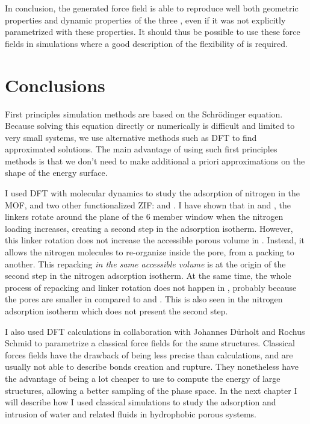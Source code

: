 \documentclass[thesis]{subfiles}
\begin{document}
In conclusion, the generated force field is able to reproduce well both
geometric properties and dynamic properties of the three , even if it was
not explicitly parametrized with these properties. It should thus be possible to
use these force fields in simulations where a good description of the
flexibility of  is required.

\clearpage
\section*{Conclusions}

First principles simulation methods are based on the Schrödinger equation.
Because solving this equation directly or numerically is difficult and limited
to very small systems, we use alternative methods such as DFT to find
approximated solutions. The main advantage of using such first principles
methods is that we don't need to make additional a priori approximations on the
shape of the energy surface.

I used DFT with molecular dynamics to study the adsorption of nitrogen in the
 MOF, and two other functionalized ZIF: \ZIFCl and \ZIFBr. I have shown
that in  and \ZIFCl, the linkers rotate around the plane of the 6 member
window when the nitrogen loading increases, creating a second step in the
adsorption isotherm. However, this linker rotation does not increase the
accessible porous volume in . Instead, it allows the nitrogen molecules to
re-organize inside the pore, from a packing to another. This repacking \emph{in
the same accessible volume} is at the origin of the second step in the nitrogen
adsorption isotherm. At the same time, the whole process of repacking and linker
rotation does not happen in \ZIFBr, probably because the pores are smaller in
\ZIFBr compared to  and \ZIFCl. This is also seen in the nitrogen
adsorption isotherm which does not present the second step.

I also used DFT calculations in collaboration with Johannes Dürholt and Rochus
Schmid to parametrize a classical force fields for the same structures.
Classical forces fields have the drawback of being less precise than \abinitio
calculations, and are usually not able to describe bonds creation and rupture.
They nonetheless have the advantage of being a lot cheaper to use to compute the
energy of large structures, allowing a better sampling of the phase space. In
the next chapter I will describe how I used classical simulations to study the
adsorption and intrusion of water and related fluids in hydrophobic porous
systems.

\OnlyInSubfile{\printglobalbibliography}
\end{document}
